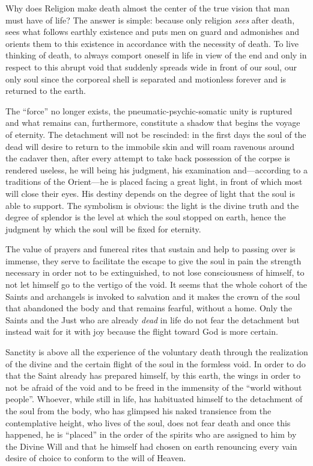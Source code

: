 Why does Religion make death almost the center of the true vision that man must have of life? The answer is simple: because only religion \emph{sees} after death, sees what follows earthly existence and puts men on guard and admonishes and orients them to this existence in accordance with the necessity of death. To live thinking of death, to always comport oneself in life in view of the end and only in respect to this abrupt void that suddenly spreads wide in front of our soul, our only soul since the corporeal shell is separated and motionless forever and is returned to the earth.

The ``force'' no longer exists, the pneumatic-psychic-somatic unity is ruptured and what remains can, furthermore, constitute a shadow that begins the voyage of eternity. The detachment will not be rescinded: in the first days the soul of the dead will desire to return to the immobile skin and will roam ravenous around the cadaver then, after every attempt to take back possession of the corpse is rendered useless, he will being his judgment, his examination and---according to a traditions of the Orient---he is placed facing a great light, in front of which most will close their eyes. His destiny depends on the degree of light that the soul is able to support. The symbolism is obvious: the light is the divine truth and the degree of splendor is the level at which the soul stopped on earth, hence the judgment by which the soul will be fixed for eternity.

The value of prayers and funereal rites that sustain and help to passing over is immense, they serve to facilitate the escape to give the soul in pain the strength necessary in order not to be extinguished, to not lose consciousness of himself, to not let himself go to the vertigo of the void. It seems that the whole cohort of the Saints and archangels is invoked to salvation and it makes the crown of the soul that abandoned the body and that remains fearful, without a home. Only the Saints and the Just who are already \emph{dead} in life do not fear the detachment but instead wait for it with joy because the flight toward God is more certain.

Sanctity is above all the experience of the voluntary death through the realization of the divine and the certain flight of the soul in the formless void. In order to do that the Saint already has prepared himself, by this earth, the wings in order to not be afraid of the void and to be freed in the immensity of the ``world without people''. Whoever, while still in life, has habituated himself to the detachment of the soul from the body, who has glimpsed his naked transience from the contemplative height, who lives of the soul, does not fear death and once this happened, he is ``placed'' in the order of the spirits who are assigned to him by the Divine Will and that he himself had chosen on earth renouncing every vain desire of choice to conform to the will of Heaven.

